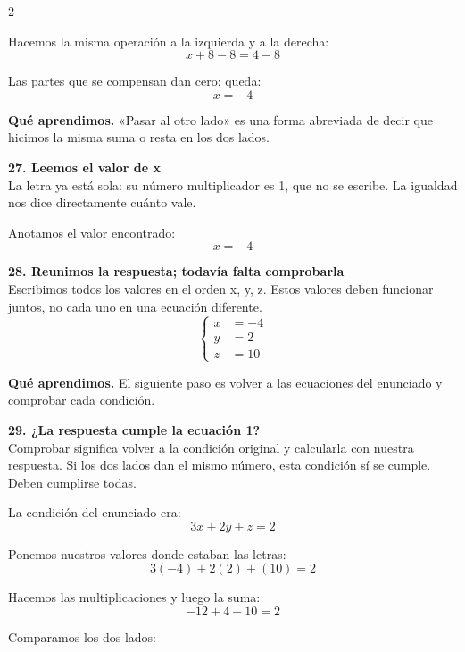 \documentclass[11pt,a4paper,landscape]{article}
\begin{document}
\begin{multicols*}{2}
\begin{minipage}{\linewidth}
\par\smallskip Hacemos la misma operación a la izquierda y a la derecha:
\[x + 8 - 8=4 - 8\]
\par\smallskip Las partes que se compensan dan cero; queda:
\[x=-4\]
\par\smallskip\textbf{Qué aprendimos.} «Pasar al otro lado» es una forma abreviada de decir que hicimos la misma suma o resta en los dos lados.
\end{minipage}\par\medskip
\noindent\begin{minipage}{\linewidth}\textbf{27. Leemos el valor de x}\\[2pt]La letra ya está sola: su número multiplicador es 1, que no se escribe. La igualdad nos dice directamente cuánto vale.
\par\smallskip Anotamos el valor encontrado:
\[x=-4\]
\end{minipage}\par\medskip
\noindent\begin{minipage}{\linewidth}\textbf{28. Reunimos la respuesta; todavía falta comprobarla}\\[2pt]Escribimos todos los valores en el orden x, y, z. Estos valores deben funcionar juntos, no cada uno en una ecuación diferente.
\[\left\{\begin{aligned}x&=-4\\y&=2\\z&=10\end{aligned}\right.\]
\par\smallskip\textbf{Qué aprendimos.} El siguiente paso es volver a las ecuaciones del enunciado y comprobar cada condición.
\end{minipage}\par\medskip
\noindent\begin{minipage}{\linewidth}\textbf{29. ¿La respuesta cumple la ecuación 1?}\\[2pt]Comprobar significa volver a la condición original y calcularla con nuestra respuesta. Si los dos lados dan el mismo número, esta condición sí se cumple. Deben cumplirse todas.
\par\smallskip La condición del enunciado era:
\[3x + 2y + z = 2\]
\par\smallskip Ponemos nuestros valores donde estaban las letras:
\[3\left(-4\right) + 2\left(2\right) + \left(10\right)=2\]
\par\smallskip Hacemos las multiplicaciones y luego la suma:
\[-12 + 4 + 10=2\]
\par\smallskip Comparamos los dos lados:

\end{minipage}
\end{multicols*}
\end{document}
